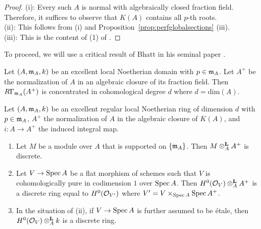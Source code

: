 \begin{proof}
(i): Every such $A$ is normal with algebraically closed fraction field. Therefore, it suffices to observe that $K(A)$ contains all $p$-th roots.\\
(ii): This follows from (i) and Proposition~\ref{prop:perfglobalsections} (iii).\\
(iii): This is the content of (1) of \cite[09Z9]{sp}.
\end{proof}
To proceed, we will use a critical result of Bhatt in his seminal paper \cite{bhattcohen}.
\begin{theorem}\label{thm:bhattcohen}
Let $(A,\ideal{m}_A,k)$ be an excellent local Noetherian domain with $p \in \ideal{m}_A$. Let $A^{+}$ be the normalization of $A$ in an algebraic closure of its fraction field. 
Then $R\Gamma_{\ideal{m}_A}(A^{+})$ is concentrated in cohomological degree $d$ where $d=\mathrm{dim}(A)$.
\end{theorem}
\begin{theorem}\label{Theorem:torindepmixed}
Let $(A,\ideal{m}_A,k)$ be an excellent regular local Noetherian ring of dimension $d$ with $p \in \ideal{m}_A$, $A^{+}$ the normalization of $A$ in the algebraic
closure of $K(A)$, and $i: A \to A^{+}$ the induced integral map.
\begin{enumerate}
\item[(i)] Let $M$ be a module over $A$ that is supported on $\{\ideal{m}_A\}$. Then $M \otimesl_A A^{+}$ is discrete.
\item[(ii)]Let $V \to \spec{A}$ be a flat morphism of schemes such that $V$ is cohomologically pure in codimension $1$ over $\spec{A}$.
 Then $H^0(\cal{O}_V) \otimesl_A A^{+}$ is a discrete ring equal to $H^0(\cal{O}_{V'})$ where $V'= V \times_{\spec{A}} \spec{A^{+}}$.
 \item[(iii)] In the situation of (ii), if $V \to \spec{A}$ is further assumed to be \'{e}tale, then $H^0(\cal{O}_V) \otimesl_A k$ is a discrete ring.
\end{enumerate}
\end{theorem}

